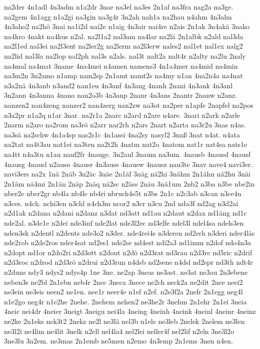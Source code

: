 {na2der
4n1adl
4n3adm
n1a2dr
3nae
na3el
na3es
2n1af
na3fra
nag2a
na3ge.
na2gem
4n1agg
n1a2gi
na3gin
na3g4r
3n2ah
nah1a
na2hau
n4ahm
4n3ahn
4n3aho2
na2hö
3nai
na1i2d
nai2e
n1aig
4n3air
nai4re
n2ais
2n1ak
3n4akä
3nako
na4kro
4nakt
na4kus
n2al.
na2l1a2
nal3am
na4lar
na2lä
2n1albk
n2ald
nal3da
na2l1ed
nal3ei
na2l3ent
na2ler2g
na2lerm
na2l3erw
nales2
nal1et
nal1ex
nalg2
na2lid
nal3la
na2lop
nal2ph
nal3s
n2als.
nal3t
nalt2a
nalt4r
n2alty
na2lu
2naly
na4mal
na4mat
3name
4na4mei
n4amen
namens3
4n1a4mer
na4mid
na4min
na3m2n
3n2amo
n1amp
nam2sp
2n1amt
namt2s
na4my
n1an
4na2n4a
na4nat
n3a2nä
4n3anb
n3and2
nan1eu
4n3anf
4n3ang
4nanh
2nani
4n3ank
4n3anl
3n2ann
4n3anna
4nano
nan2o3b
4n3anp
2nanr
4n3ans
2nantr
2nanw
n2anz.
nanzen2
nan4zeng
nanzer2
nan4zerg
nan2zw
na3ot
na2per
n1apfe
2napfel
na2pos
n3a2pr
n1a2q
n1ar
3nar.
na2r1a
2narc
n2ard
n2are
n4are.
3nari
n2ark
n2arle
2narm
n2aro
na2rom
na3rö
n2arr
nar2rh
n2ars
2nart
n2arta
na3r2u
3nas
n4as.
na3sä
na2schw
4n1a4sp
nas2s1c
4n1assi
4na2sy
nasyl2
3naß
3nat
n4at.
n4ata
na2tat
na4t3au
nat1ei
na3ten
na2t2h
4natm
nat2o
4natom
nat1r
nat4sa
nats1e
na4tt
n4a3tu
n1au
nauf2fr
4nauge.
3n2aul
3naum
na3um.
4nausb
4nausd
4nausf
4nausg
4nausl
n2auso
4nausr
4n3auss
4nausw
4nausz
nau3te
3nav
nave4
navi3er.
navi3ers
na2x
1nä
2näb
3n2äc
3näe
2n1äf
3näg
nä2hi
3nähm
2n1ähn
nä2hu
3näi
2n1äm
nä4mi
2n1än
2näp
2näq
nä2sc
n2äss
2näu
3nä1um
2nb2
n3ba
n3be
nbe2in
nber2e
nber2gr
nb4la
nb4le
nb4ri
nbruch4s5t
n3bs
2n1c
n2c3ab
n3can
n3ce4n
n3ces.
n4ch.
nchi3en
n3chl
n4ch3m
ncor2
n3cr
n3cu
2nd
nda3f
nd2ag
n3d2ai
n2d1ak
n2dana
n2dani
n2danz
n3dat
nd3att
nd1au
n2daut
n2dax
nd1äng
nd1c
nde2al.
n3de1e
n2dei
nde3inf
nde2lat
nde3l2ec
nd3elfe
ndel3l
ndel4sa
ndels3en
nden3sk
n2dentl
n2dents
nde3o2
n3der.
nde4rei4s
n3deren
nd2erh
n3deri
nder4läs
nde2rob
n2de2ros
nder4sat
nd2es1
nde2se
nd4est
ndi2a3
nd1imm
n2dof
ndo4n3a
n2dopt
nd1or
n2do2ri
n2d3ott
n2dout
n2dö
n2d3rat
nd3rau
n2d3re
nd5ric
n2drif
n2d3roc
n2drod
n2d3rö
n2drui
n2d3run
n4dsb
nd2sene
n4dsl
nd2spr
nd3th
ndt4r
n2duns
ndy3
ndys2
ndys4p
1ne
3ne.
ne2ap
3neas
ne3ast.
ne3at
ne3au
2n3ebene
neben3s
ne2bl
2n1ebn
neb4r
2nec
3neca
3nece
ne2ch
neck2a
ne2dit
2nee
neei2
ne3ein
ne3eis
neen2
ne1en.
nee1r
neer4e
n1ef
n2ef.
n2e3f2a
2nefr
2n1egg
neg4l
n1e2go
neg4r
n1e2he
2nehe.
2nehem
nehen2
ne3he2r
3nehm
2n1ehr
2n1ei
3neia
4neic
nei4dr
4neier
3neigt
3neigu
nei4la
4neing
4neinh
4neink
4neinl
4neinr
4neinz
ne2ke
2n1eks
nek3t2
2nekz
ne2l
ne3lä
nel3b
n1ele
ne3leb
2nelek
2nelem
ne3len
ne3l2i
ne4lim
ne4lit
3nelk
n2ell
nel4la4
nel2lei
neller4f
nel2lif
n2eln
3ne3l2o
3ne3lu
3n2em.
ne3mas
2n1emb
ne5men
n2emo
4n3emp
2n1ems
3nen
n4en.
}
